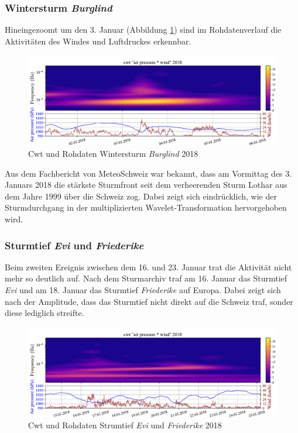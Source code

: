 \begin{refsection}
\subsubsection{Wintersturm {\em Burglind} }
\label{burglind}
%
Hineingezoomt um den 3. Januar (Abbildung \ref{fig:cwt_storm_zoom}) sind im Rohdatenverlauf die Aktivitäten des Windes und Luftdruckes erkennbar. 
\begin{figure}[b]
	\centering
	\includegraphics[width=1\textwidth]{papers/wwt/images/storm_airp_wind_zoom.pdf}
	\caption{Cwt und Rohdaten Wintersturm {\em Burglind}  2018}
	\label{fig:cwt_storm_zoom}
\end{figure}
Aus dem Fachbericht \space \cite{Fachbericht:Burglind} von MeteoSchweiz war bekannt, dass am Vormittag des 3. Januars 2018 die stärkste Sturmfront seit dem verheerenden Sturm Lothar aus dem Jahre 1999 über die Schweiz zog.
%
%
Dabei zeigt sich eindrücklich, wie der Sturmdurchgang in der multiplizierten Wavelet-Transformation hervorgehoben wird.

\subsubsection{Sturmtief {\em Evi}  und {\em Friederike} }
\label{evi}
%
%
Beim zweiten Ereignis zwischen dem 16. und 23. Januar trat die Aktivität nicht mehr so deutlich auf.
Nach dem Sturmarchiv  \cite{online:sturmarchiv} traf am 16. Januar das Sturmtief {\em Evi}  und am 18. Januar das Sturmtief {\em Friederike} auf Europa. Dabei zeigt sich nach der Amplitude, dass das Sturmtief nicht direkt auf die Schweiz traf, sonder diese lediglich streifte. 

\begin{figure}
	\centering
	\includegraphics[width=1\textwidth]{papers/wwt/images/storm_airp_wind_zoom2.pdf}
	\caption{Cwt und Rohdaten Strumtief {\em Evi}  und {\em Friederike} 2018}
	\label{fig:cwt_storm_zoom2}
\end{figure}




\end{refsection}
